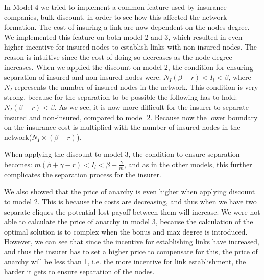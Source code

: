In Model-4 we tried to implement a common feature used by insurance companies, bulk-discount, in order to see how this affected the network formation. The cost of insuring a link are now dependent on the nodes degree. We implemented this feature on both model 2 and 3, which resulted in even higher incentive for insured nodes to establish links with non-insured nodes. The reason is intuitive since the cost of doing so decreases as the node degree increases. 
When we applied the discount on model 2, the condition for ensuring separation of insured and non-insured nodes were: $N_{I}(\beta-r)<I_{l}<\beta$, where $N_{I}$ represents the number of insured nodes in the network. This condition is very strong, because for the separation to be possible the following has to hold: $N_{I}(\beta-r)<\beta$. As we see, it is now more difficult for the insurer to separate insured and non-insured, compared to model 2. Because now the lower boundary on the insurance cost is multiplied with the number of insured nodes in the network($N_{I}\times(\beta-r)$).

When applying the discount to model 3, the condition to ensure separation becomes: $m(\beta+\gamma-r)<I_{l}<\beta+\frac{\gamma}{m}$, and as in the other models, this further complicates the separation process for the insurer. 

We also showed that the price of anarchy is even higher when applying discount to model 2. This is because the costs are decreasing, and thus when we have two separate cliques the potential lost payoff between them will increase.
We were not able to calculate the price of anarchy in model 3, because the calculation of the optimal solution is to complex when the bonus and max degree is introduced. However, we can see that since the incentive for establishing links have increased, and thus the insurer has to set a higher price to compensate for this, the price of anarchy will be less than 1, i.e. the more incentive for link establishment, the harder it gets to ensure separation of the nodes.  

